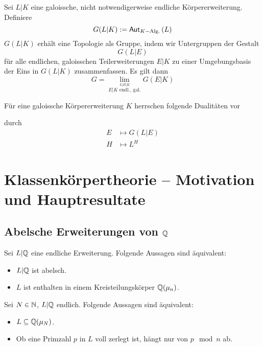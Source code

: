 \documentclass{book}
\begin{document}
\Satz{}
Sei $L|K$ eine galoissche, nicht notwendigerweise endliche Körpererweiterung. Definiere
\[ G(L|K) :=\textsf{Aut}_{K-\text{Alg.}}\left(L\right) \]
$G(L|K)$ erhält eine Topologie als Gruppe, indem wir Untergruppen der Gestalt
\[ G(L|E) \]
für alle endlichen, galoisschen Teilerweiterungen $E|K$ zu einer Umgebungsbasis der Eins in $G(L|K)$ zusammenfassen. Es gilt dann
\[ G = \lim\limits_{\stackrel{L|E|K}{E|K \text{ endl., gal.}}}G(E|K) \]

Für eine galoissche Körpererweiterung  $K$ herrschen folgende Dualitäten vor
\begin{center}
\end{center}
durch
\begin{align*}
E & \longmapsto G(L|E)\\
H & \longmapsto L^H
\end{align*}



\chapter{Klassenkörpertheorie -- Motivation und Hauptresultate}
\section{Abelsche Erweiterungen von $\mathbb{Q}$}
Sei $L|\mathbb{Q}$ eine endliche Erweiterung. Folgende Aussagen sind äquivalent:
\begin{itemize}
	\item $L|\mathbb{Q}$ ist abelsch.
	\item $L$ ist enthalten in einem Kreisteilungskörper $\mathbb{Q}(\mu_n)$.
\end{itemize}

\Satz{}
Sei $N \in \mathbb{N}$, $L |\mathbb{Q}$ endlich. Folgende Aussagen sind äquivalent:
\begin{itemize}
	\item $L \subseteq \mathbb{Q}(\mu_N)$.
	\item Ob eine Primzahl $p$ in $L$ voll zerlegt ist, hängt nur von $p\mod{n}$ ab.
\end{itemize}
\end{document}
